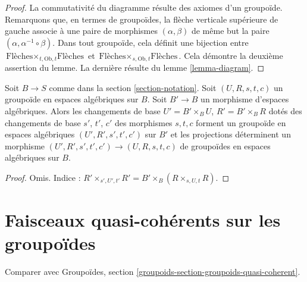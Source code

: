 \begin{proof}
La commutativité du diagramme résulte des axiomes d'un groupoïde. Remarquons que, en termes de groupoïdes, la flèche verticale supérieure de gauche associe à une paire de morphismes $(\alpha, \beta)$ de même but la paire $(\alpha, \alpha^{-1} \circ \beta)$. Dans tout groupoïde, cela définit une bijection entre $\text{Flèches} \times_{t, \text{Ob}, t} \text{Flèches}$ et $\text{Flèches} \times_{s, \text{Ob}, t} \text{Flèches}$. Cela démontre la deuxième assertion du lemme. La dernière résulte du lemme \ref{lemma-diagram}.
\end{proof}

\begin{lemma}
\label{lemma-base-change-groupoid}
Soit $B \to S$ comme dans la section \ref{section-notation}. Soit $(U, R, s, t, c)$ un groupoïde en espaces algébriques sur $B$. Soit $B' \to B$ un morphisme d'espaces algébriques. Alors les changements de base $U' = B' \times_B U$, $R' = B' \times_B R$ dotés des changements de base $s'$, $t'$, $c'$ des morphismes $s, t, c$ forment un groupoïde en espaces algébriques $(U', R', s', t', c')$ sur $B'$ et les projections déterminent un morphisme $(U', R', s', t', c') \to (U, R, s, t, c)$ de groupoïdes en espaces algébriques sur $B$.
\end{lemma}

\begin{proof}
Omis. Indice : $R' \times_{s', U', t'} R' = B' \times_B (R \times_{s, U, t} R)$.
\end{proof}





\section{Faisceaux quasi-cohérents sur les groupoïdes}
\label{section-groupoids-quasi-coherent}

\noindent
Comparer avec Groupoïdes, section \ref{groupoids-section-groupoids-quasi-coherent}.

